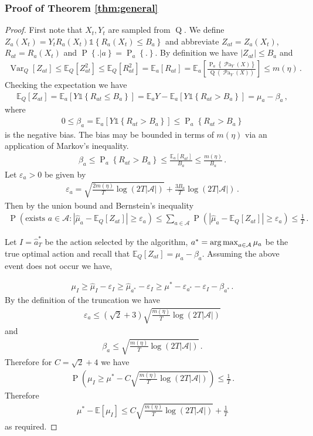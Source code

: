 \documentclass[11pt,a4paper,twoside]{report}
\newcommand{\Q}[1]{\operatorname{Q}\left(#1\right)}
\newcommand{\EE}{\mathbb E}
\newcommand{\EEa}{\EE_a}
\newcommand{\Pns}[2]{\operatorname{P}_{#1}\left\{#2\right\}}
\newcommand{\Pn}[2]{\operatorname{P}\left\{#2|#1\right\}}
\newcommand{\calA}{\mathcal A}
\newcommand{\Var}{\operatorname{Var}}
\newcommand{\set}[1]{\left\{#1\right\}}
\newcommand{\ind}[1]{\mathds{1}\!\!\set{#1}}
\newcommand{\argmax}{\operatornamewithlimits{arg\,max}}
\newcommand{\eq}[1]{\begin{align*}#1\end{align*}}
\renewcommand{\P}[1]{\operatorname{P}\left(#1\right)}
\newcommand{\parents}[1]{\operatorname{\mathcal{P}a}_{#1}}
\theoremstyle{plain}
\theoremstyle{definition}
\let\epsilon\varepsilon
\begin{document}
\subsubsection{Proof of Theorem \ref{thm:general}}\label{sec:thm:general}

\begin{proof}
First note that $X_t, Y_t$ are sampled from $\operatorname{Q}$.
We define $Z_a(X_t) = Y_t R_a(X_t)\ind{R_a(X_t)\leq B_a}$ and abbreviate $Z_{at} = Z_a(X_t)$, $R_{at} = R_a(X_t)$ and $\Pn{a}{.} = \Pns{a}{.}$.
By definition we have $|Z_{at}| \leq B_a$ and 
\eq{
\Var_Q[Z_{at}] 
\leq \EE_Q[Z_{at}^2] 
\leq \EE_Q[R_{at}^2]
= \EEa[R_{at}]
= \EEa\left[\frac{\Pns{a}{\parents{Y}(X)}}{\Q{\parents{Y}(X)}}\right] 
\leq m(\eta)\,.
}
Checking the expectation we have
\eq{
\EE_Q[Z_{at}] 
= \EEa \left[Y \ind{R_{at} \leq B_a}\right] 
= \EEa Y - \EEa \left[Y\ind{R_{at} > B_a}\right] 
= \mu_a - \beta_a\,,
}
where 
\eq{
0 \leq \beta_a = \EEa[Y \ind{R_{at} > B_a}] \leq \Pns{a}{R_{at} > B_a}
}
is the negative bias. 
The bias may be bounded in terms of $m(\eta)$ via an application of Markov's inequality.
\eq{
\beta_a \leq \Pns{a}{R_{at} > B_a} \leq \frac{\EEa[R_{at}]}{B_a} \leq \frac{m(\eta)}{B_a}\,.
}
Let $\epsilon_a > 0$ be given by
\eq{
\epsilon_a = \sqrt{\frac{2m(\eta)}{T} \log\left(2T|\calA|\right)} + \frac{3B_a}{T} \log\left(2T|\calA|\right)\,.
}
Then by the union bound and Bernstein's inequality 
\eq{
\P{\text{exists } a \in \calA : \left|\hat \mu_a - \EE_Q[Z_{at}]\right| \geq \epsilon_a} 
\leq \sum_{a \in \calA} \P{\left|\hat \mu_a - \EE_Q[Z_{at}]\right| \geq \epsilon_a} \leq \frac{1}{T}\,.
}

Let $I = \hat{a}^*_T$ be the action selected by the algorithm, $a^* = \argmax_{a \in \calA} \mu_a$ be the true optimal action and recall that $\EE_Q[Z_{at}] = \mu_a - \beta_a$. Assuming the above event does not occur we have,

\eq{
\mu_I \geq \hat \mu_I - \epsilon_I  
\geq \hat \mu_{a^*} - \epsilon_I  
\geq \mu^* - \epsilon_{a^*} - \epsilon_I - \beta_{a^*}\,. 
}
By the definition of the truncation
we have
\eq{
\epsilon_a \leq \left(\sqrt{2} + 3\right)\sqrt{\frac{m(\eta)}{T} \log\left(2T|\calA|\right)}
}
and
\eq{
\beta_a \leq \sqrt{\frac{m(\eta)}{T} \log\left(2T|\calA|\right)}\,. 
}
Therefore for $C = \sqrt{2} + 4$ we have
\eq{
\P{\mu_I \geq \mu^* - C \sqrt{\frac{m(\eta)}{T} \log\left(2T|\calA|\right)}} \leq \frac{1}{T}\,.
}
Therefore
\eq{
\mu^* - \EE[\mu_I] \leq C \sqrt{\frac{m(\eta)}{T} \log\left(2T|\calA|\right)} + \frac{1}{T}
}
as required.
\end{proof}
\end{document}
